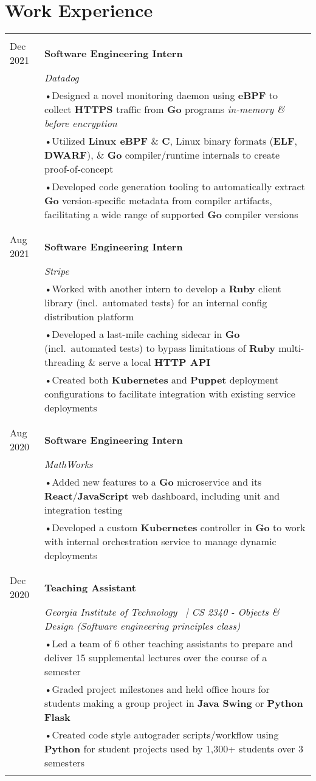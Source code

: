 \documentclass[a4paper,11pt]{article}
\newenvironment{rsection}[1]
  {
    \section{#1}
    \begin{tabular}{>{\raggedleft\arraybackslash}p{\lcolwidth}|p{\rcolwidth}}
   } {
    \\\multicolumn{2}{c}{} \\[-10pt]
    \end{tabular}
  }
\newcommand{\rheader}[2]{
    \multirow[t]{2}{*}{
        \begin{minipage}[t]{\dimexpr \lcolwidth - 0.1cm}
            \begin{flushright}
                \textsc{#1}
            \end{flushright}
        \end{minipage}
    } & \textbf{#2}
}
\newcommand{\rdesc}[1]{
  \\[-2pt]&\small{\emph{#1}\vspace{1pt} }
}
\newcommand{\ritem}[2][ •\hspace{3pt}]{\\[-2pt]& \footnotesize{#1#2}}
\newcommand{\rskip}{\\\multicolumn{2}{c}{} \\[\subsectionvspace]}
\begin{document}
\begin{rsection}{Work Experience}
  \rheader{Aug 2021 -\\[-1pt] Dec 2021}{Software Engineering Intern}
  \rdesc{Datadog}
  \ritem{Designed a novel monitoring daemon using \textbf{eBPF}
    to collect \textbf{HTTPS} traffic from \textbf{Go} programs \textit{in-memory \& before encryption}}
  \ritem{Utilized \textbf{Linux eBPF} \& \textbf{C}, Linux binary formats (\textbf{ELF}, \textbf{DWARF}),
    \& \textbf{Go} compiler/runtime internals to create proof-of-concept}
  \ritem{Developed code generation tooling to automatically extract \textbf{Go} version-specific
    metadata from compiler artifacts, facilitating a wide range of supported \textbf{Go} compiler versions}
  \rskip

  \rheader{May 2021 -\\[-1pt] Aug 2021}{Software Engineering Intern}
  \rdesc{Stripe}
  \ritem{Worked with another intern to develop a \textbf{Ruby} client library (incl.\ automated tests)
    for an internal config distribution platform}
  \ritem{Developed a last-mile caching sidecar in \textbf{Go} (incl.\ automated tests) to
    bypass limitations of \textbf{Ruby} multi-threading \& serve a local \textbf{HTTP API}}
  \ritem{Created both \textbf{Kubernetes} and \textbf{Puppet} deployment
    configurations to facilitate integration with existing service deployments}
  \rskip

  \rheader{May 2020 -\\[-1pt] Aug 2020}{Software Engineering Intern}
  \rdesc{MathWorks}
  \ritem{Added new features to a \textbf{Go} microservice
    and its \textbf{React}/\textbf{JavaScript} web dashboard, including unit and integration testing}
  \ritem{Developed a custom \textbf{Kubernetes} controller
    in \textbf{Go} to work with internal orchestration service to manage dynamic deployments}
  \rskip

  \rheader{Aug 2019 -\\[-1pt] Dec 2020}{Teaching Assistant}
  \rdesc{Georgia Institute of Technology \ {\normalfont |}\hspace{2pt}
    CS 2340 - Objects \& Design (Software engineering principles class)}
  \ritem{Led a team of 6 other teaching assistants to prepare and deliver 15 supplemental lectures
    over the course of a semester}
  \ritem{Graded project milestones and held office hours for students
    making a group project in \textbf{Java Swing} or \textbf{Python Flask}}
  \ritem{Created code style autograder scripts/workflow using \textbf{Python}
    for student projects used by 1,300+ students over 3 semesters}
\end{rsection}
\vspace{\sectionvspace}
\end{document}
